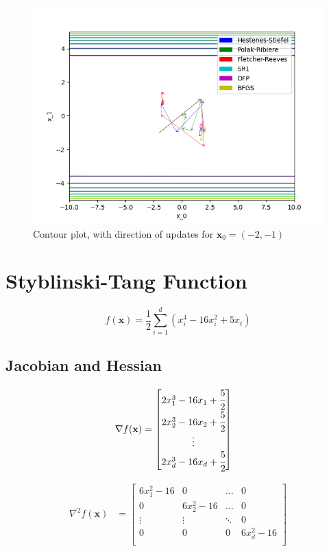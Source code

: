 \documentclass[a4paper]{article}
\begin{document}
\begin{figure}[H]
    \centering
    \includegraphics[width=.65\textwidth]{three_hump_camel_function_cont.png}
    \caption{Contour plot, with direction of updates for $\textbf{x}_0 = (-2, -1)$}
\end{figure}

\section{Styblinski-Tang Function}

$$f(\textbf{x}) = \frac{1}{2} \sum_{i=1}^d (x_i^4 - 16 x_i^2 + 5 x_i)$$

\subsection{Jacobian and Hessian}

\begin{align*}
\nabla f(\textbf{x}) &=
    \begin{bmatrix}
        2 x_1^3 - 16 x_1 + \cfrac{5}{2} \\
        2 x_2^3 - 16 x_2 + \cfrac{5}{2} \\
        \vdots \\
        2 x_d^3 - 16 x_d + \cfrac{5}{2} \\
    \end{bmatrix}
\end{align*}

\begin{align*}
\nabla^2 f(\textbf{x}) &=
    \begin{bmatrix}
        6 x_1^2 - 16 & 0 & \dots & 0 \\
        0 & 6 x_2^2 - 16 & \dots & 0 \\
        \vdots & \vdots & \ddots & 0 \\
        0 & 0 & 0 & 6 x_d^2 - 16 \\
    \end{bmatrix}
\end{align*}
\end{document}
